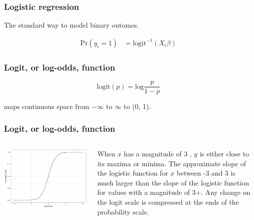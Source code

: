 \documentclass{beamer}
\begin{document}
\begin{frame}
  \frametitle{Logistic regression}

  \begin{center}
    The standard way to model binary outomes.
  \end{center}

  \begin{align*}
    \text{Pr}(y_{i} = 1) &= \text{logit}^{-1}(X_{i}\beta)
  \end{align*}
\end{frame}

\begin{frame}
  \frametitle{Logit, or log-odds, function}

  \[
    \text{logit}(p) = \text{log} \frac{p}{1 - p}
  \]

  \begin{center}
    maps continuous space from \(-\infty\) to \(\infty\) to (0, 1).
  \end{center}

\end{frame}

\begin{frame}
  \frametitle{Logit, or log-odds, function}

  \begin{columns}
    \begin{column}{0.5\textwidth}
      \includegraphics[width=\textwidth,height=0.8\textheight,keepaspectratio=true]{logisitic-demo-1}
    \end{column}
    \begin{column}{0.5\textwidth}
      When \(x\) has a magnitude of 3 , \(y\) is either close to its maxima or minima. The approximate slope of the logistic function for \(x\) between -3 and 3 is much larger than the slope of the logistic function for values with a magnitude of 3+. Any change on the logit scale is compressed at the ends of the probability scale.
    \end{column}
  \end{columns}
\end{frame}
\end{document}
